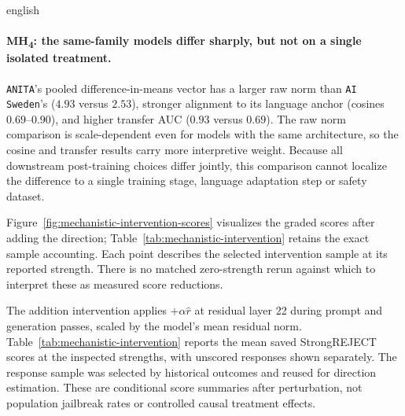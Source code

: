\begin{otherlanguage*}{english}
\GradedMechanisticCorrelationTable

\paragraph*{MH\textsubscript{4}: the same-family models differ sharply, but not on a single isolated treatment.} \texttt{ANITA}'s pooled difference-in-means vector has a larger raw norm than \texttt{AI Sweden}'s ($4.93$ versus $2.53$), stronger alignment to its language anchor (cosines $0.69$--$0.90$), and higher transfer AUC ($0.93$ versus $0.69$). The raw norm comparison is scale-dependent even for models with the same architecture, so the cosine and transfer results carry more interpretive weight. Because all downstream post-training choices differ jointly, this comparison cannot localize the difference to a single training stage, language adaptation step or safety dataset.

\setcounter{secnumdepth}{3}

\clearpage
Figure~\ref{fig:mechanistic-intervention-scores} visualizes the graded scores after adding the direction; Table~\ref{tab:mechanistic-intervention} retains the exact sample accounting. Each point describes the selected intervention sample at its reported strength. There is no matched zero-strength rerun against which to interpret these as measured score reductions.


\GradedInterventionTable
{}

The addition intervention applies $+\alpha\hat{r}$ at residual layer 22 during prompt and generation passes, scaled by the model's mean residual norm. Table~\ref{tab:mechanistic-intervention} reports the mean saved StrongREJECT scores at the inspected strengths, with unscored responses shown separately. The response sample was selected by historical outcomes and reused for direction estimation. These are conditional score summaries after perturbation, not population jailbreak rates or controlled causal treatment effects.


\end{otherlanguage*}
